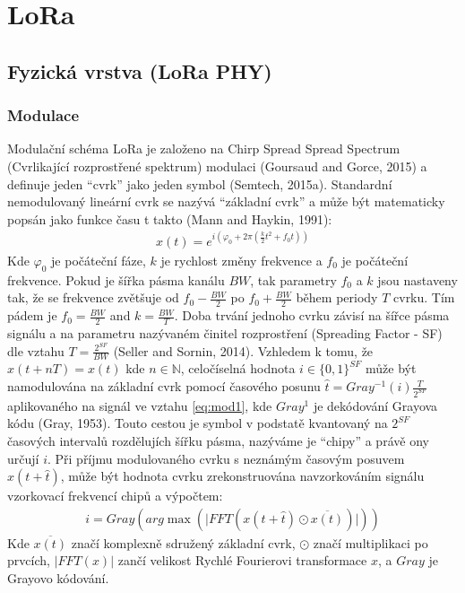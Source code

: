 \documentclass{ctuthesis}
\begin{document}
\chapter{LoRa}
\section{Fyzická vrstva (LoRa PHY)}
\subsection{Modulace}
Modulační schéma LoRa je založeno na Chirp Spread Spread Spectrum (Cvrlikající rozprostřené spektrum) modulaci  (Goursaud and Gorce, 2015) a definuje jeden “cvrk” jako jeden symbol  (Semtech, 2015a). Standardní nemodulovaný lineární cvrk se nazývá “základní cvrk” a může být matematicky popsán jako funkce času t takto (Mann and Haykin, 1991):
\begin{align}x(t)=e^{i(\varphi_{0}+2\pi(\frac{k}{2}t^{2} + f_{0}t))}
\label{eq:lora1}
\end{align}
Kde  $\varphi_{0}$ je počáteční fáze, $k$ je rychlost změny frekvence a $f_{0}$ je počáteční frekvence. Pokud je šířka pásma kanálu $BW$, tak parametry $f_{0}$ a $k$ jsou nastaveny tak, že se frekvence zvětšuje od $f_{0}-\frac{BW}{2}$ po $f_{0}+\frac{BW}{2}$ během periody $T$ cvrku. Tím pádem je $f_{0}=\frac{BW}{2}$ and $k = \frac{BW}{T}$. Doba trvání jednoho cvrku závisí na šířce pásma signálu a na parametru nazývaném činitel rozprostření (Spreading Factor - SF) dle vztahu $T = \frac{2^{SF}}{BW}$ (Seller and Sornin, 2014).
Vzhledem k tomu, že $x(t + nT) = x(t)$ kde $n\in \mathbb{N}$, celočíselná hodnota $i \in \{0, 1\}^{SF}$ může být namodulována na základní cvrk pomocí časového posunu $\hat{t} = Gray^{-1}(i)\frac{T}{2^{SF}}$ aplikovaného na signál ve vztahu \eqref{eq:mod1},  kde $Gray^{1}$ je dekódování Grayova kódu (Gray, 1953). Touto cestou je symbol v podstatě kvantovaný na $2^{SF}$ časových intervalů rozdělujích šířku pásma, nazýváme je “chipy” a právě ony určují $i$. Při příjmu modulovaného cvrku s neznámým časovým posuvem $x(t + \hat{t})$, může být hodnota cvrku zrekonstruována navzorkováním signálu vzorkovací frekvencí chipů a výpočtem:
\begin{align}i= Gray(arg \max (\lvert FFT(x(t+ \hat{t}) \odot \overline{x(t)}) \rvert ))
\label{eq:lora2}
\end{align}
Kde $\overline{x(t)}$ značí komplexně sdružený základní cvrk, $\odot$ značí multiplikaci po prvcích, $\lvert FFT(x) \rvert$ zančí velikost Rychlé Fourierovi transformace $x$, a $Gray$ je Grayovo kódování. 
\end{document}
